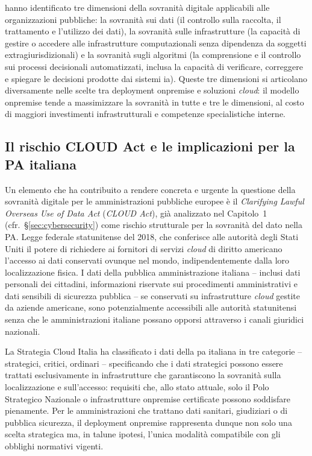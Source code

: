 \textcite{Couture2019} hanno identificato tre dimensioni della sovranità digitale applicabili alle organizzazioni pubbliche: la sovranità sui dati (il controllo sulla raccolta, il trattamento e l'utilizzo dei dati), la sovranità sulle infrastrutture (la capacità di gestire o accedere alle infrastrutture computazionali senza dipendenza da soggetti extragiurisdizionali) e la sovranità sugli algoritmi (la comprensione e il controllo sui processi decisionali automatizzati, inclusa la capacità di verificare, correggere e spiegare le decisioni prodotte dai sistemi \gls{ia}). Queste tre dimensioni si articolano diversamente nelle scelte tra deployment \gls{onpremise} e soluzioni \textit{cloud}: il modello \gls{onpremise} tende a massimizzare la sovranità in tutte e tre le dimensioni, al costo di maggiori investimenti infrastrutturali e competenze specialistiche interne.

\subsection{Il rischio CLOUD Act e le implicazioni per la PA italiana}

Un elemento che ha contribuito a rendere concreta e urgente la questione della sovranità digitale per le amministrazioni pubbliche europee è il \textit{Clarifying Lawful Overseas Use of Data Act} (\textit{CLOUD Act}), già analizzato nel Capitolo~1 (cfr.~§\ref{sec:cybersecurity}) come rischio strutturale per la sovranità del dato nella PA. Legge federale statunitense del 2018, che conferisce alle autorità degli Stati Uniti il potere di richiedere ai fornitori di servizi \textit{cloud} di diritto americano l'accesso ai dati conservati ovunque nel mondo, indipendentemente dalla loro localizzazione fisica. I dati della pubblica amministrazione italiana -- inclusi dati personali dei cittadini, informazioni riservate sui procedimenti amministrativi e dati sensibili di sicurezza pubblica -- se conservati su infrastrutture \textit{cloud} gestite da aziende americane, sono potenzialmente accessibili alle autorità statunitensi senza che le amministrazioni italiane possano opporsi attraverso i canali giuridici nazionali.

La Strategia Cloud Italia \parencite{StrategiaCloudItalia} ha classificato i dati della \gls{pa} italiana in tre categorie -- strategici, critici, ordinari -- specificando che i dati strategici possono essere trattati esclusivamente in infrastrutture che garantiscono la sovranità sulla localizzazione e sull'accesso: requisiti che, allo stato attuale, solo il Polo Strategico Nazionale o infrastrutture \gls{onpremise} certificate possono soddisfare pienamente. Per le amministrazioni che trattano dati sanitari, giudiziari o di pubblica sicurezza, il deployment \gls{onpremise} rappresenta dunque non solo una scelta strategica ma, in talune ipotesi, l'unica modalità compatibile con gli obblighi normativi vigenti.

